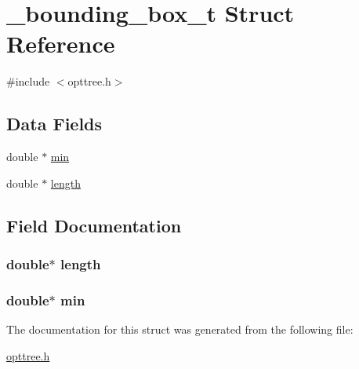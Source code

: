 \hypertarget{a00001}{\section{\-\_\-bounding\-\_\-box\-\_\-t \-Struct \-Reference}
\label{d8/d84/a00001}
}


{\ttfamily \#include $<$opttree.\-h$>$}

\subsection*{\-Data \-Fields}
\begin{DoxyCompactItemize}
\item 
double $\ast$ \hyperlink{a00001_a84ea468000e399560bbee8281490337d_a84ea468000e399560bbee8281490337d}{min}
\item 
double $\ast$ \hyperlink{a00001_a09e0af5cee100ccbd0d3583e245c2782_a09e0af5cee100ccbd0d3583e245c2782}{length}
\end{DoxyCompactItemize}


\subsection{\-Field \-Documentation}
\hypertarget{a00001_a09e0af5cee100ccbd0d3583e245c2782_a09e0af5cee100ccbd0d3583e245c2782}{
\subsubsection[{length}]{\setlength{\rightskip}{0pt plus 5cm}double$\ast$ {\bf length}}}\label{d8/d84/a00001_a09e0af5cee100ccbd0d3583e245c2782_a09e0af5cee100ccbd0d3583e245c2782}
\hypertarget{a00001_a84ea468000e399560bbee8281490337d_a84ea468000e399560bbee8281490337d}{
\subsubsection[{min}]{\setlength{\rightskip}{0pt plus 5cm}double$\ast$ {\bf min}}}\label{d8/d84/a00001_a84ea468000e399560bbee8281490337d_a84ea468000e399560bbee8281490337d}


\-The documentation for this struct was generated from the following file\-:\begin{DoxyCompactItemize}
\item 
\hyperlink{a00020}{opttree.\-h}\end{DoxyCompactItemize}

